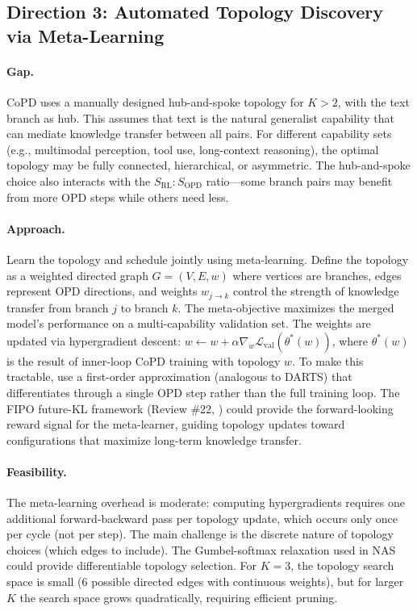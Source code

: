 \documentclass[11pt]{article}
\begin{document}
\subsection{Direction 3: Automated Topology Discovery via Meta-Learning}

\paragraph{Gap.}
CoPD uses a manually designed hub-and-spoke topology for $K > 2$, with the text branch as hub. This assumes that text is the natural generalist capability that can mediate knowledge transfer between all pairs. For different capability sets (e.g., multimodal perception, tool use, long-context reasoning), the optimal topology may be fully connected, hierarchical, or asymmetric. The hub-and-spoke choice also interacts with the $S_{\mathrm{RL}} : S_{\mathrm{OPD}}$ ratio---some branch pairs may benefit from more OPD steps while others need less.

\paragraph{Approach.}
Learn the topology and schedule jointly using meta-learning. Define the topology as a weighted directed graph $G = (V, E, w)$ where vertices are branches, edges represent OPD directions, and weights $w_{j \to k}$ control the strength of knowledge transfer from branch $j$ to branch $k$. The meta-objective maximizes the merged model's performance on a multi-capability validation set. The weights are updated via hypergradient descent: $w \leftarrow w + \alpha \nabla_w \mathcal{L}_{\mathrm{val}}(\theta^*(w))$, where $\theta^*(w)$ is the result of inner-loop CoPD training with topology $w$. To make this tractable, use a first-order approximation (analogous to DARTS) that differentiates through a single OPD step rather than the full training loop. The FIPO future-KL framework (Review \#22, \cite{fipo}) could provide the forward-looking reward signal for the meta-learner, guiding topology updates toward configurations that maximize long-term knowledge transfer.

\paragraph{Feasibility.}
The meta-learning overhead is moderate: computing hypergradients requires one additional forward-backward pass per topology update, which occurs only once per cycle (not per step). The main challenge is the discrete nature of topology choices (which edges to include). The Gumbel-softmax relaxation used in NAS could provide differentiable topology selection. For $K = 3$, the topology search space is small (6 possible directed edges with continuous weights), but for larger $K$ the search space grows quadratically, requiring efficient pruning.
\end{document}
